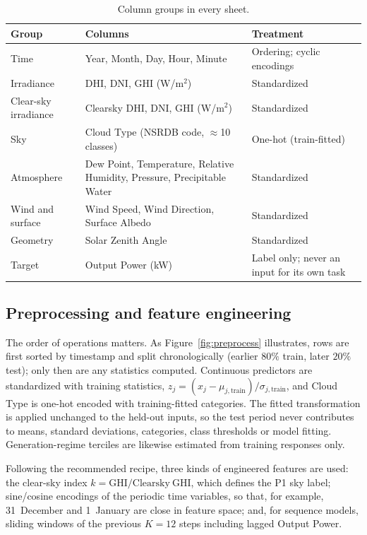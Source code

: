 \documentclass[11pt,letterpaper]{article}
\begin{document}
\begin{table}[!htbp]\centering\footnotesize
\caption{Column groups in every sheet.}\label{tab:features}
\setlength{\tabcolsep}{5pt}
\begin{tabularx}{\textwidth}{@{}lXl@{}}\toprule
\textbf{Group} & \textbf{Columns} & \textbf{Treatment}\\\midrule
Time & Year, Month, Day, Hour, Minute & Ordering; cyclic encodings\\
Irradiance & DHI, DNI, GHI (W/m$^2$) & Standardized\\
Clear-sky irradiance & Clearsky DHI, DNI, GHI (W/m$^2$) & Standardized\\
Sky & Cloud Type (NSRDB code, $\approx$10 classes) & One-hot (train-fitted)\\
Atmosphere & Dew Point, Temperature, Relative Humidity, Pressure, Precipitable Water & Standardized\\
Wind and surface & Wind Speed, Wind Direction, Surface Albedo & Standardized\\
Geometry & Solar Zenith Angle & Standardized\\
Target & Output Power (kW) & Label only; never an input for its own task\\
\bottomrule\end{tabularx}
\end{table}

\subsection{Preprocessing and feature engineering}
The order of operations matters. As Figure~\ref{fig:preprocess} illustrates, rows are first
sorted by timestamp and split chronologically (earlier $80\%$ train, later $20\%$ test); only then
are any statistics computed. Continuous predictors are standardized with training statistics,
$z_j=(x_j-\mu_{j,\mathrm{train}})/\sigma_{j,\mathrm{train}}$, and Cloud Type is one-hot encoded with
training-fitted categories. The fitted transformation is applied unchanged to the held-out
inputs, so the test period never contributes to means, standard deviations, categories,
class thresholds or model fitting. Generation-regime terciles are likewise estimated from training
responses only.

Following the recommended recipe, three kinds of engineered features are used:
the clear-sky index $k=\mathrm{GHI}/\mathrm{Clearsky\ GHI}$, which defines the P1 sky label;
sine/cosine encodings of the periodic time variables, so that, for example, 31~December and
1~January are close in feature space; and, for sequence models, sliding windows of the previous
$K=12$ steps including lagged Output Power.
\end{document}
